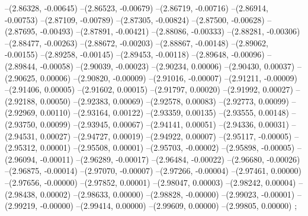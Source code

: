 --(2.86328, -0.00645)
--(2.86523, -0.00679)
--(2.86719, -0.00716)
--(2.86914, -0.00753)
--(2.87109, -0.00789)
--(2.87305, -0.00824)
--(2.87500, -0.00628)
--(2.87695, -0.00493)
--(2.87891, -0.00421)
--(2.88086, -0.00333)
--(2.88281, -0.00306)
--(2.88477, -0.00263)
--(2.88672, -0.00203)
--(2.88867, -0.00148)
--(2.89062, -0.00155)
--(2.89258, -0.00145)
--(2.89453, -0.00118)
--(2.89648, -0.00096)
--(2.89844, -0.00058)
--(2.90039, -0.00023)
--(2.90234, 0.00006)
--(2.90430, 0.00037)
--(2.90625, 0.00006)
--(2.90820, -0.00009)
--(2.91016, -0.00007)
--(2.91211, -0.00009)
--(2.91406, 0.00005)
--(2.91602, 0.00015)
--(2.91797, 0.00020)
--(2.91992, 0.00027)
--(2.92188, 0.00050)
--(2.92383, 0.00069)
--(2.92578, 0.00083)
--(2.92773, 0.00099)
--(2.92969, 0.00110)
--(2.93164, 0.00122)
--(2.93359, 0.00135)
--(2.93555, 0.00148)
--(2.93750, 0.00099)
--(2.93945, 0.00067)
--(2.94141, 0.00051)
--(2.94336, 0.00031)
--(2.94531, 0.00027)
--(2.94727, 0.00019)
--(2.94922, 0.00007)
--(2.95117, -0.00005)
--(2.95312, 0.00001)
--(2.95508, 0.00001)
--(2.95703, -0.00002)
--(2.95898, -0.00005)
--(2.96094, -0.00011)
--(2.96289, -0.00017)
--(2.96484, -0.00022)
--(2.96680, -0.00026)
--(2.96875, -0.00014)
--(2.97070, -0.00007)
--(2.97266, -0.00004)
--(2.97461, 0.00000)
--(2.97656, -0.00000)
--(2.97852, 0.00001)
--(2.98047, 0.00003)
--(2.98242, 0.00004)
--(2.98438, 0.00002)
--(2.98633, 0.00000)
--(2.98828, -0.00000)
--(2.99023, -0.00001)
--(2.99219, -0.00000)
--(2.99414, 0.00000)
--(2.99609, 0.00000)
--(2.99805, 0.00000)
;
